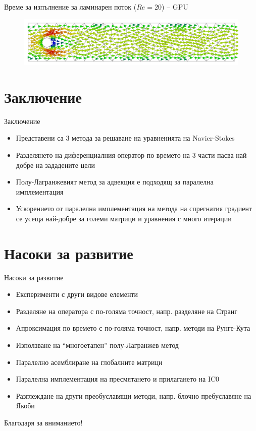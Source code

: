 \documentclass{beamer}
\begin{document}
\begin{frame}{Време за изпълнение за ламинарен поток ($Re = 20$) -- GPU}
\begin{figure}[H]
\centering
\includegraphics[width=\textwidth]{../../Figures/01_introduction/P2P1_adv_diff_100.pdf}
\end{figure}

\end{frame}

\section{Заключение}
\begin{frame}{Заключение}
\begin{itemize}[<+->]
	\item Представени са 3 метода за решаване на уравненията на Navier-Stokes
	\item Разделянето на диференциалния оператор по времето на 3 части пасва най-добре на зададените цели
	\item Полу-Лагранжевият метод за адвекция е подходящ за паралелна имплементация
	\item Ускорението от паралелна имплементация на метода на спрегнатия градиент се усеща най-добре за големи матрици и уравнения с много итерации
\end{itemize}
\end{frame}

\section{Насоки за развитие}
\begin{frame}{Насоки за развитие}
	\begin{itemize}[<+->]
		\item Експерименти с други видове елементи
		\item Разделяне на оператора с по-голяма точност, напр. разделяне на Странг
		\item Апроксимация по времето с по-голяма точност, напр. методи на Рунге-Кута
		\item Използване на ``многоетапен'' полу-Лагранжев метод
		\item Паралелно асемблиране на глобалните матрици
		\item Паралелна имплементация на пресмятането и прилагането на IC0
		\item Разглеждане на други преобуславящи методи, напр. блочно пребуславяне на Якоби
	\end{itemize}
\end{frame}

\begin{frame}
	\centering
	\Large
	Благодаря за вниманието!
\end{frame}
\end{document}
